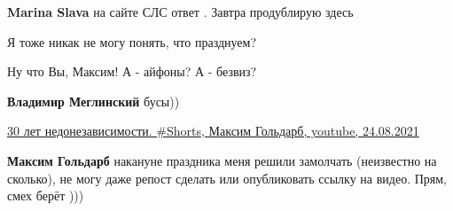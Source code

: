 \begin{itemize}
\begin{itemize}
 
\textbf{Marina Slava} на сайте СЛС ответ . Завтра продублирую здесь
\end{itemize}

 
Я тоже никак не могу понять, что празднуем?

 
Ну что Вы, Максим! А - айфоны? А - безвиз?

\begin{itemize}
 
\textbf{Владимир Меглинский} бусы))
\end{itemize}

 
\href{https://youtu.be/26aki14F3wU}{%
30 лет недонезависимости. \#Shorts, Максим Гольдарб, youtube, 24.08.2021%
}

\begin{itemize}
 
\textbf{Максим Гольдарб} накануне праздника меня решили замолчать (неизвестно на сколько), не могу даже репост сделать или опубликовать ссылку на видео. Прям, смех берёт )))

 

\end{itemize}
\end{itemize}
